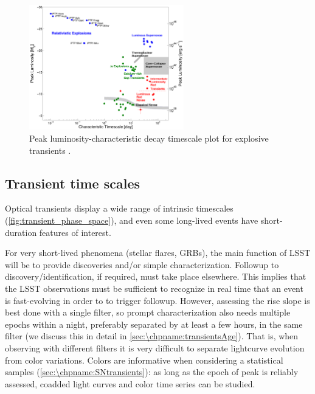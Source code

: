 \begin{figure}[hbt]
\centerline{
\includegraphics[width=0.6\textwidth]{figs/transients/taumv_2014.pdf}
}
\caption{
Peak luminosity-characteristic decay timescale plot for explosive
transients \citep[adapted from][]{2011PhDT........35K}.
}
\label{fig:transient_phase_space}
\end{figure}





%




\subsection{Transient time scales}

Optical transients display a wide range of intrinsic timescales
(\autoref{fig:transient_phase_space}), and even some long-lived events
have short-duration features of interest.

For very short-lived phenomena (stellar flares, GRBs),
the main function of LSST will be to provide discoveries and/or simple
characterization.  Followup to discovery/identification, if required,
must take place elsewhere. This implies that the LSST observations
must be sufficient to recognize in real time that an event is fast-evolving
in order to to trigger followup. However, assessing the rise
slope is best done with a single filter, so prompt characterization
also needs multiple epochs within a night, preferably separated by at
least a few hours, in the same filter (we discuss this in detail in
\autoref{sec:\chpname:transientsAge}). That is, when observing with different
filters it is very difficult to separate lightcurve evolution from
color variations. Colors are informative when considering a statistical
samples (\autoref{sec:\chpname:SNtransients}): as long as the epoch of peak is
reliably assessed, coadded light curves and color time series can be studied.

